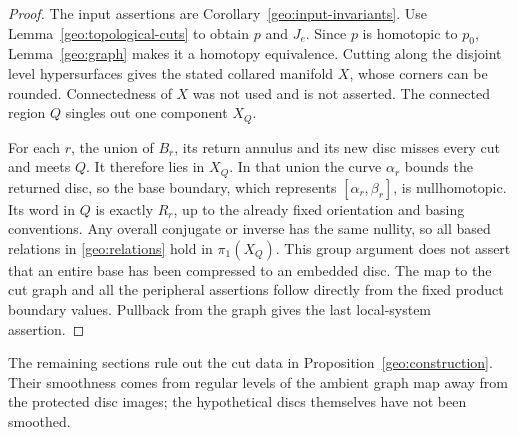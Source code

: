 \begin{proof}
The input assertions are Corollary~\ref{geo:input-invariants}.
Use Lemma~\ref{geo:topological-cuts} to obtain $p$ and $J_e$.
Since $p$ is homotopic to $p_0$, Lemma~\ref{geo:graph} makes
it a homotopy equivalence.  Cutting along the disjoint level
hypersurfaces gives the stated collared manifold $X$, whose
corners can be rounded.  Connectedness of $X$ was not used
and is not asserted.  The connected region $Q$ singles out
one component $X_Q$.

For each $r$, the union of $B_r$, its return annulus and its
new disc misses every cut and meets $Q$.  It therefore lies
in $X_Q$.  In that union the curve $\alpha_r$ bounds the
returned disc, so the base boundary, which represents
$[\alpha_r,\beta_r]$, is nullhomotopic.  Its word in $Q$ is
exactly $R_r$, up to the already fixed orientation and basing
conventions.  Any overall conjugate or inverse has the same
nullity, so all based relations in \eqref{geo:relations}
hold in $\pi_1(X_Q)$.  This group argument does not assert
that an entire base has been compressed to an embedded disc.
The map to the cut graph and all the peripheral assertions
follow directly from the fixed product boundary values.
Pullback from the graph gives the last local-system assertion.
\end{proof}

The remaining sections rule out the cut data in
Proposition~\ref{geo:construction}.  Their smoothness comes from
regular levels of the ambient graph map away from the protected disc
images; the hypothetical discs themselves have not been smoothed.

\newpage
